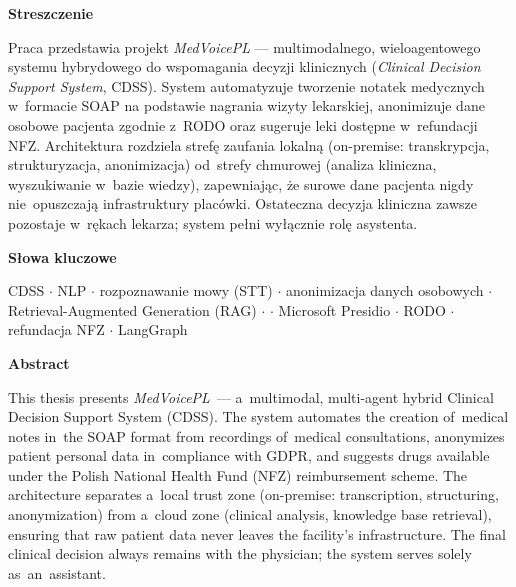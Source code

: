
\thispagestyle{plain}

\begin{center}
{\Large\bfseries Streszczenie\par}
\end{center}

\vspace{0.5cm}

\noindent
Praca przedstawia projekt \emph{MedVoicePL} --- multimodalnego, wieloagentowego
systemu hybrydowego do wspomagania decyzji klinicznych (\emph{Clinical Decision
Support System}, CDSS). System automatyzuje tworzenie notatek medycznych
w~formacie SOAP na podstawie nagrania wizyty lekarskiej, anonimizuje dane
osobowe pacjenta zgodnie z~RODO oraz sugeruje leki dostępne w~refundacji NFZ.
Architektura rozdziela strefę zaufania lokalną (on-premise: transkrypcja,
strukturyzacja, anonimizacja) od~strefy chmurowej (analiza kliniczna,
wyszukiwanie w~bazie wiedzy), zapewniając, że surowe dane pacjenta nigdy
nie~opuszczają infrastruktury placówki. Ostateczna decyzja kliniczna zawsze
pozostaje w~rękach lekarza; system pełni wyłącznie rolę asystenta.

\vspace{1.5cm}

\begin{center}
{\Large\bfseries Słowa kluczowe\par}
\end{center}

\vspace{0.5cm}

\noindent
CDSS $\cdot$ NLP $\cdot$ rozpoznawanie mowy (STT) $\cdot$ anonimizacja danych
osobowych $\cdot$ Retrieval-Augmented Generation (RAG) $\cdot$
 $\cdot$ Microsoft Presidio $\cdot$ RODO $\cdot$
refundacja NFZ $\cdot$ LangGraph

\cleardoublepage

\thispagestyle{plain}

\begin{center}
{\Large\bfseries Abstract\par}
\end{center}

\vspace{0.5cm}

\noindent
This thesis presents \emph{MedVoicePL}~--- a~multimodal, multi-agent hybrid
Clinical Decision Support System (CDSS). The system automates the creation
of~medical notes in~the SOAP format from recordings of~medical consultations,
anonymizes patient personal data in~compliance with GDPR, and suggests drugs
available under the Polish National Health Fund (NFZ) reimbursement scheme.
The architecture separates a~local trust zone (on-premise: transcription,
structuring, anonymization) from a~cloud zone (clinical analysis, knowledge
base retrieval), ensuring that raw patient data never leaves the facility's
infrastructure.  The final clinical decision always remains with the
physician; the system serves solely as~an~assistant.

